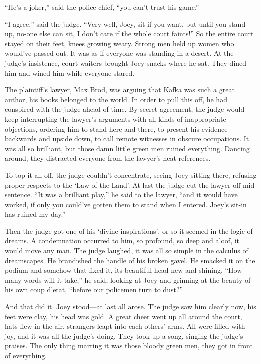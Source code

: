 \documentclass[oneside]{book}
\begin{document}
``He's a joker,'' said the police chief, ``you can't trust his game.''

``I agree,'' said the judge.  ``Very well, Joey, sit if you want, but until you
stand up, no-one else can sit, I don't care if the whole court faints!''  So
the entire court stayed on their feet, knees growing weary.  Strong men held up
women who would've passed out.  It was as if everyone was standing in a desert.
At the judge's insistence, court waiters brought Joey snacks where
he sat.  They dined him and wined him while everyone stared.

The plaintiff's lawyer, Max Brod, was arguing that Kafka was such a great
author, his books belonged to the world.  In order to pull this off, he had
conspired with the judge ahead of time.  By secret agreement, the judge would
keep interrupting the lawyer's arguments with all kinds of inappropriate objections,
ordering him to stand here and there, to present his evidence backwards and
upside down, to call remote witnesses in obscure occupations.  It was all so
brilliant, but those damn little green men ruined everything.  Dancing around,
they distracted everyone from the lawyer's neat references.

To top it all off, the judge couldn't concentrate, seeing Joey sitting there,
refusing proper respects to the `Law of the Land'.  At last the judge
cut the lawyer off mid-sentence.  ``It was a brilliant play,'' he said to the
lawyer, ``and it would have worked, if only you could've gotten them
to stand when I entered.  Joey's sit-in has ruined my
day.''

Then the judge got one of his `divine inspirations', or so it seemed in the
logic of dreams.  A condemnation occurred to him, so profound, so
deep and aloof, it would move any man.  The judge laughed, it was all so simple
in the calculus of dreamscapes.  He brandished the handle of his broken gavel.
He smacked it on the podium and somehow that fixed it, its beautiful head
new and shining.  ``How many words will it take,'' he said, looking at Joey
and grinning at the beauty of his own coup d'etat, ``before our policemen
turn to dust?''

And that did it.  Joey stood---at last all arose.
The judge saw him clearly now, his feet were clay, his
head was gold.  A great cheer went up all around the court,
hats flew in the air, strangers leapt into each others' arms.
All were filled with joy, and it was all the judge's doing.  They
took up a song, singing the judge's praises.  The only thing marring
it was those bloody green men, they got in front of everything.
\end{document}
